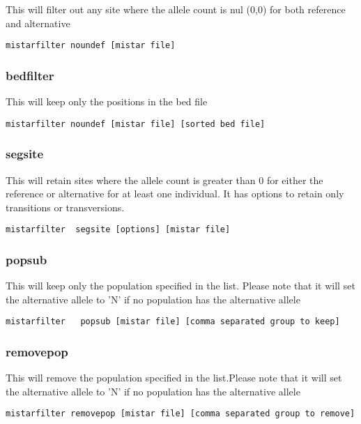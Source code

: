 \documentclass[a4paper]{article}
\begin{document}
This will filter out any site where the allele count is nul (0,0) for both reference and alternative

\begin{verbatim}
mistarfilter noundef [mistar file]
\end{verbatim}


\subsubsection{bedfilter}

This will keep only the positions in the bed file

\begin{verbatim}
mistarfilter noundef [mistar file] [sorted bed file]
\end{verbatim}

\subsubsection{segsite}

This will retain sites where the allele count is greater than 0 for either the reference or alternative for at least one individual. It has options to retain only transitions or transversions. 

\begin{verbatim}
mistarfilter  segsite [options] [mistar file]
\end{verbatim}

\subsubsection{popsub}

This will keep only the population specified in the list. Please note that it will set the alternative allele to 'N' if no population has the alternative allele

\begin{verbatim}
mistarfilter   popsub [mistar file] [comma separated group to keep]
\end{verbatim}

\subsubsection{removepop}

This will remove the population specified in the list.Please note that it will set the alternative allele to 'N' if no population has the alternative allele

\begin{verbatim}
mistarfilter removepop [mistar file] [comma separated group to remove]
\end{verbatim}
\end{document}
